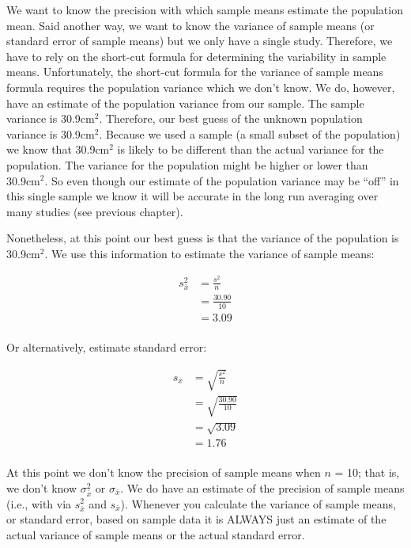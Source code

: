 \documentclass[
]{krantz}
\begin{document}
We want to know the precision with which sample means estimate the population mean. Said another way, we want to know the variance of sample means (or standard error of sample means) but we only have a single study. Therefore, we have to rely on the short-cut formula for determining the variability in sample means. Unfortunately, the short-cut formula for the variance of sample means formula requires the population variance which we don't know. We do, however, have an estimate of the population variance from our sample. The sample variance is 30.9cm\(^2\). Therefore, our best guess of the unknown population variance is 30.9cm\(^2\). Because we used a sample (a small subset of the population) we know that 30.9cm\(^2\) is likely to be different than the actual variance for the population. The variance for the population might be higher or lower than 30.9cm\(^2\). So even though our estimate of the population variance may be ``off'' in this single sample we know it will be accurate in the long run averaging over many studies (see previous chapter).

Nonetheless, at this point our best guess is that the variance of the population is 30.9cm\(^2\). We use this information to estimate the variance of sample means:

\[
\begin{aligned} 
s^2_{\bar{x}} &= \frac{s^2}{n} \\
&= \frac{30.90}{10} \\
&= 3.09 \\
\end{aligned} 
\]

Or alternatively, estimate standard error:

\[
\begin{aligned} 
s_{\bar{x}} &= \sqrt{\frac{s^2}{n}} \\
&= \sqrt{\frac{30.90}{10}} \\
&= \sqrt{3.09} \\
&= 1.76 \\
\end{aligned} 
\]

At this point we don't know the precision of sample means when \(n\) = 10; that is, we don't know \(\sigma_{\bar{x}}^2\) or \(\sigma_{\bar{x}}\). We do have an estimate of the precision of sample means (i.e., with via \(s_{\bar{x}}^2\) and \(s_{\bar{x}}\)). Whenever you calculate the variance of sample means, or standard error, based on sample data it is ALWAYS just an estimate of the actual variance of sample means or the actual standard error.
\end{document}

